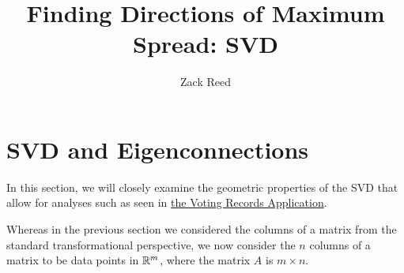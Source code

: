 \documentclass{ximera}
\author{Zack Reed}
\title{Finding Directions of Maximum Spread: SVD}
\begin{document}
\begin{abstract}

\end{abstract}
\maketitle


\section{SVD and Eigenconnections}


In this section, we will closely examine the geometric properties of the SVD that allow for analyses such as seen in \href{https://ximera.osu.edu/appliedlinearalgebra/c6ChapterSix/learningActivities/m6LearningActivities/leastSquares/leastSquaresApplicationVotingImages}{the Voting Records Application}.

Whereas in the previous section we considered the columns of a matrix from the standard transformational perspective, we now consider the $n$ columns of a matrix to be data points in $\mathbb{R}^m$, where the matrix $A$ is $m\times n$. 
\end{document}
